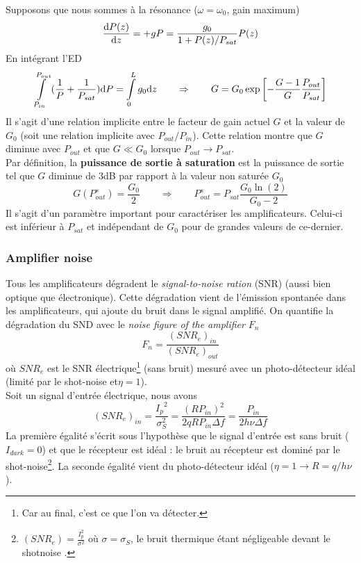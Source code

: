 Supposons que nous sommes à la résonance ($\omega=\omega_0$, gain maximum)
\begin{equation}
\frac{{{\rm{d}}P(z)}}{{{\rm{d}}z}} =  + gP = \frac{{{g_0}}}{{1 + P(z)/{P_{sat}}}}P(z)
\end{equation}
En intégrant l'ED
\begin{equation}
\int\limits_{{P_{in}}}^{{P_{out}}} {(\frac{1}{P} + \frac{1}{{{P_{sat}}}}){\rm{d}}P}  = \int\limits_0^L {{g_0}{\rm{d}}z} \qquad\Rightarrow\qquad
G = {G_0}\exp \left[ { - \frac{{G - 1}}{G}\frac{{{P_{out}}}}{{{P_{sat}}}}} \right]
\end{equation}
Il s'agit d'une relation implicite entre le facteur de gain actuel $G$ et la valeur de $G_0$ (soit
une relation implicite avec $P_{out}/P_{in}$). Cette relation montre que $G$ diminue avec $P_{out}$ et
que $G\ll G_0$ lorsque $P_{out}\to P_{sat}$.\\

Par définition, la \textbf{puissance de sortie à saturation} est la puissance de sortie tel que 
$G$ diminue de 3dB par rapport à la valeur non saturée $G_0$
\begin{equation}
G(P_{out}^s) = \frac{{{G_0}}}{2}\qquad\Rightarrow\qquad
P_{out}^s = {P_{sat}}\frac{{{G_0}\ln (2)}}{{{G_0} - 2}}
\end{equation}
Il s'agit d'un paramètre important pour caractériser les amplificateurs. Celui-ci est inférieur à 
$P_{sat}$ et indépendant de $G_0$ pour de grandes valeurs de ce-dernier.


\subsubsection{Amplifier noise}
Tous les amplificateurs dégradent le \textit{signal-to-noise ration} (SNR) (aussi bien optique que
électronique). Cette dégradation vient de l'émission spontanée dans les amplificateurs, qui ajoute
du bruit dans le signal amplifié. On quantifie la dégradation du SND avec le \textit{noise figure of
the amplifier} $F_n$
\begin{equation}
{F_n} = \frac{{{{(SN{R_e})}_{in}}}}{{{{(SN{R_e})}_{out}}}}
\end{equation}
où $SNR_e$ est le SNR électrique\footnote{Car au final, c'est ce que l'on va détecter.} (sans bruit)
mesuré avec un photo-détecteur idéal (limité par le shot-noise et$\eta = 1$).\\

Soit un signal d'entrée électrique, nous avons
\begin{equation}
{(SN{R_e})_{in}} = \frac{{{I_p}^2}}{{\sigma _S^2}} = \frac{{{{(R{P_{in}})}^2}}}{{2qR{P_{in}}\Delta f}} 
= \frac{{{P_{in}}}}{{2h\nu \Delta f}}
\end{equation}
La première égalité s'écrit sous l'hypothèse que le signal d'entrée est sans bruit ($I_{dark}=0$) 
et que le récepteur est idéal  : le bruit au récepteur est dominé par le shot-noise\footnote{$(SNR_e) = \frac{I_p^2}{\sigma^2}$ où $\sigma=\sigma_S$, le bruit thermique étant négligeable devant le shotnoise
.}. La seconde égalité vient du photo-détecteur idéal ($\eta=1\to R = q/h\nu$).\\

